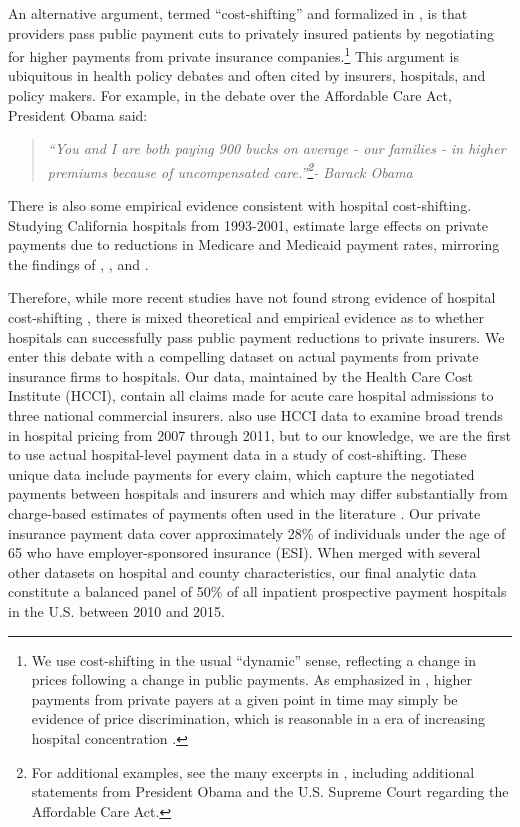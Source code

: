 \documentclass[12pt]{article}
\begin{document}
An alternative argument, termed ``cost-shifting'' and formalized in \cite{dranove1988}, is that providers pass public payment cuts to privately insured patients by negotiating for higher payments from private insurance companies.\footnote{We use cost-shifting in the usual ``dynamic'' sense, reflecting a change in prices following a change in public payments. As emphasized in \cite{hay1983}, higher payments from private payers at a given point in time may simply be evidence of price discrimination, which is reasonable in a era of increasing hospital concentration \citep{gaynor2015jel}.} This argument is ubiquitous in health policy debates and often cited by insurers, hospitals, and policy makers. For example, in the debate over the Affordable Care Act, President Obama said:
\begin{quote}
\textit{``You and I are both paying 900 bucks on average - our families - in higher premiums because of uncompensated care.''\footnote{For additional examples, see the many excerpts in \cite{dranove2017}, including additional statements from President Obama and the U.S. Supreme Court regarding the Affordable Care Act.}- Barack Obama}
\end{quote}
There is also some empirical evidence consistent with hospital cost-shifting. Studying California hospitals from 1993-2001, \cite{zwanziger2006} estimate large effects on private payments due to reductions in Medicare and Medicaid payment rates, mirroring the findings of \cite{lee2003}, \cite{zwanziger2000}, and \cite{cutler1998costshift}.

Therefore, while more recent studies have not found strong evidence of hospital cost-shifting \citep{frakt2011}, there is mixed theoretical and empirical evidence as to whether hospitals can successfully pass public payment reductions to private insurers. We enter this debate with a compelling dataset on actual payments from private insurance firms to hospitals.  Our data, maintained by the Health Care Cost Institute (HCCI), contain all claims made for acute care hospital admissions to three national commercial insurers. \cite{cooper2015} also use HCCI data to examine broad trends in hospital pricing from 2007 through 2011, but to our knowledge, we are the first to use actual hospital-level payment data in a study of cost-shifting. These unique data include payments for every claim, which capture the negotiated payments between hospitals and insurers and which may differ substantially from charge-based estimates of payments often used in the literature \citep{dafny2009,dranove2017}. Our private insurance payment data cover approximately 28\% of individuals under the age of 65 who have employer-sponsored insurance (ESI). When merged with several other datasets on hospital and county characteristics, our final analytic data constitute a balanced panel of 50\% of all inpatient prospective payment hospitals in the U.S. between 2010 and 2015.
\end{document}
